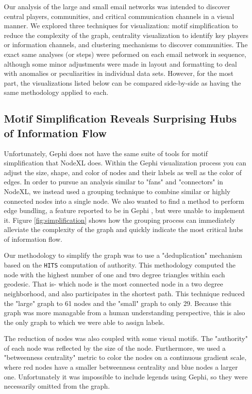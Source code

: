 \documentclass[11pt,letterpaper]{article}
\begin{document}
Our analysis of the large and small email networks was intended to discover central players, communities, and critical communication channels in a visual manner. We explored three techniques for visualization: motif simplification to reduce the complexity of the graph, centrality visualization to identify key players or information channels, and clustering mechanisms to discover communities. The exact same analyses (or steps) were peformed on each email network in sequence, although some minor adjustments were made in layout and formatting to deal with anomalies or peculiarities in individual data sets. However, for the most part, the visualizations listed below can be compared side-by-side as having the same methodology applied to each.

\subsection*{Motif Simplification Reveals Surprising Hubs of Information Flow}

Unfortunately, Gephi does not have the same suite of tools for motif simplification that NodeXL does. Within the Gephi visualization process you can adjust the size, shape, and color of nodes and their labels as well as the color of edges. In order to pursue an analysis similar to "fans" and "connectors" in NodeXL, we instead used a grouping technique to combine similar or highly connected nodes into a single node. We also wanted to find a method to perform edge bundling, a feature reported to be in Gephi \cite{pupyrev_edge_2012,gansner_multilevel_2011}, but were unable to implement it. Figure \ref{fig:simplification} shows how the grouping process can immediately alleviate the complexity of the graph and quickly indicate the most critical hubs of information flow.

Our methodology to simplify the graph was to use a "deduplication" mechanism based on the \texttt{HITS} computation of authority. This methodology computed the node with the highest number of one and two degree triangles within each geodesic. That is- which node is the most connected node in a two degree neighborhood, and also participates in the shortest path. This technique reduced the "large" graph to 61 nodes and the "small" graph to only 29. Because this graph was more managable from a human understanding perspective, this is also the only graph to which we were able to assign labels.

The reduction of nodes was also coupled with some visual motifs. The "authority" of each node was reflected by the size of the node. Furthermore, we used a "betweenness centrality" metric to color the nodes on a continuous gradient scale, where red nodes have a smaller betweenness centrality and blue nodes a larger one. Unfortunately it was impossible to include legends using Gephi, so they were necessarily omitted from the graph.
\end{document}
